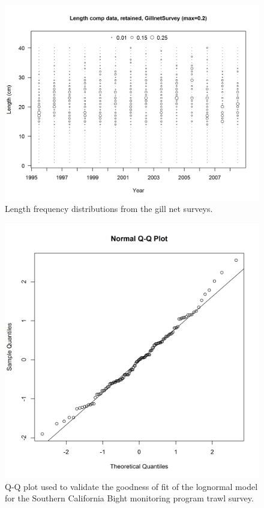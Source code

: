 \documentclass[12pt,]{article}
\begin{document}
\begin{figure}[htbp]
\centering
\includegraphics{r4ss/plots_mod1/comp_lendat_bubflt9mkt2.png}
\caption{Length frequency distributions from the gill net surveys.
\label{fig:Fleet9_GillnetSurvey_lendat_bubflt10mkt2}}
\end{figure}

\FloatBarrier

\begin{figure}[htbp]
\centering
\includegraphics{Figures/Fleet11_SCBsurvey_QQ.png}
\caption{Q-Q plot used to validate the goodness of fit of the lognormal
model for the Southern California Bight monitoring program trawl survey.
\label{fig:Fleet11_SCBsurvey_QQ}}
\end{figure}
\end{document}
